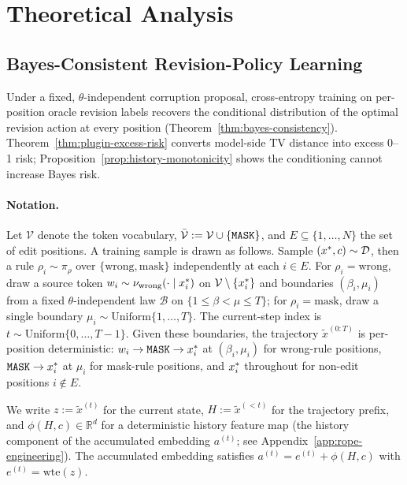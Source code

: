 \clearpage
\appendix

\section{Theoretical Analysis}
\label{app:theory}

\subsection{Bayes-Consistent Revision-Policy Learning}
\label{app:bayes-consistency}

Under a fixed, $\theta$-independent corruption proposal, cross-entropy training on per-position oracle revision labels recovers the conditional distribution of the optimal revision action at every position (Theorem~\ref{thm:bayes-consistency}). Theorem~\ref{thm:plugin-excess-risk} converts model-side TV distance into excess 0--1 risk; Proposition~\ref{prop:history-monotonicity} shows the \temporalmethodfull conditioning cannot increase Bayes risk.

\paragraph{Notation.}
Let $\mathcal{V}$ denote the token vocabulary, $\bar{\mathcal{V}} := \mathcal{V} \cup \{\texttt{MASK}\}$, and $E \subseteq \{1, \ldots, N\}$ the set of edit positions. A training sample is drawn as follows. Sample $(x^{\ast}, c) \sim \mathcal{D}$, then a rule $\rho_i \sim \pi_\rho$ over $\{\mathrm{wrong}, \mathrm{mask}\}$ independently at each $i \in E$. For $\rho_i = \mathrm{wrong}$, draw a source token $w_i \sim \nu_{\mathrm{wrong}}(\cdot \mid x^{\ast}_i)$ on $\mathcal{V} \setminus \{x^{\ast}_i\}$ and boundaries $(\beta_i, \mu_i)$ from a fixed $\theta$-independent law $\mathcal{B}$ on $\{1 \le \beta < \mu \le T\}$; for $\rho_i = \mathrm{mask}$, draw a single boundary $\mu_i \sim \mathrm{Uniform}\{1, \ldots, T\}$. The current-step index is $t \sim \mathrm{Uniform}\{0, \ldots, T-1\}$. Given these boundaries, the trajectory $\tilde{x}^{(0:T)}$ is per-position deterministic: $w_i \to \texttt{MASK} \to x^{\ast}_i$ at $(\beta_i, \mu_i)$ for wrong-rule positions, $\texttt{MASK} \to x^{\ast}_i$ at $\mu_i$ for mask-rule positions, and $x^{\ast}_i$ throughout for non-edit positions $i \notin E$.

We write $z := \tilde{x}^{(t)}$ for the current state, $H := \tilde{x}^{(<t)}$ for the trajectory prefix, and $\phi(H, c) \in \mathbb{R}^d$ for a deterministic history feature map (the history component of the \temporalmethod accumulated embedding $a^{(t)}$; see Appendix~\ref{app:rope-engineering}). The accumulated embedding satisfies $a^{(t)} = e^{(t)} + \phi(H, c)$ with $e^{(t)} = \mathrm{wte}(z)$.

